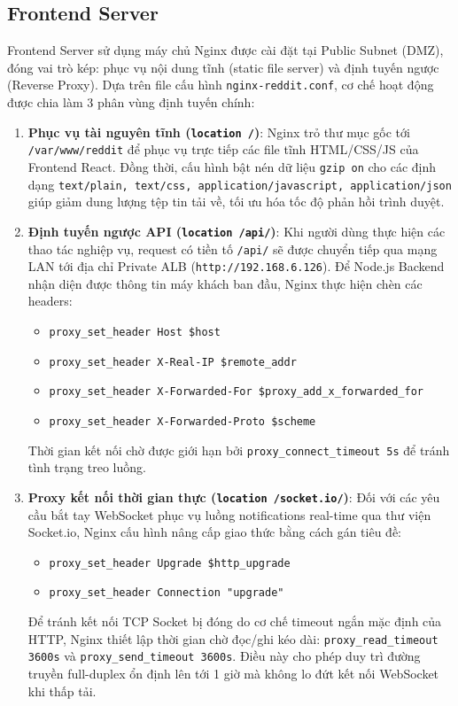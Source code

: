\documentclass[12pt, a4paper]{article}
\begin{document}
\subsection{Frontend Server}
Frontend Server sử dụng máy chủ Nginx được cài đặt tại Public Subnet (DMZ), đóng vai trò kép: phục vụ nội dung tĩnh (static file server) và định tuyến ngược (Reverse Proxy). Dựa trên file cấu hình \texttt{nginx-reddit.conf}, cơ chế hoạt động được chia làm 3 phân vùng định tuyến chính:
\begin{enumerate}
    \item \textbf{Phục vụ tài nguyên tĩnh (\texttt{location /})}:
    Nginx trỏ thư mục gốc tới \texttt{/var/www/reddit} để phục vụ trực tiếp các file tĩnh HTML/CSS/JS của Frontend React. Đồng thời, cấu hình bật nén dữ liệu \texttt{gzip on} cho các định dạng \texttt{text/plain, text/css, application/javascript, application/json} giúp giảm dung lượng tệp tin tải về, tối ưu hóa tốc độ phản hồi trình duyệt.
    \item \textbf{Định tuyến ngược API (\texttt{location /api/})}:
    Khi người dùng thực hiện các thao tác nghiệp vụ, request có tiền tố \texttt{/api/} sẽ được chuyển tiếp qua mạng LAN tới địa chỉ Private ALB (\texttt{http://192.168.6.126}). Để Node.js Backend nhận diện được thông tin máy khách ban đầu, Nginx thực hiện chèn các headers:
    \begin{itemize}
        \item \texttt{proxy\_set\_header Host \$host}
        \item \texttt{proxy\_set\_header X-Real-IP \$remote\_addr}
        \item \texttt{proxy\_set\_header X-Forwarded-For \$proxy\_add\_x\_forwarded\_for}
        \item \texttt{proxy\_set\_header X-Forwarded-Proto \$scheme}
    \end{itemize}
    Thời gian kết nối chờ được giới hạn bởi \texttt{proxy\_connect\_timeout 5s} để tránh tình trạng treo luồng.
    \item \textbf{Proxy kết nối thời gian thực (\texttt{location /socket.io/})}:
    Đối với các yêu cầu bắt tay WebSocket phục vụ luồng notifications real-time qua thư viện Socket.io, Nginx cấu hình nâng cấp giao thức bằng cách gán tiêu đề:
    \begin{itemize}
        \item \texttt{proxy\_set\_header Upgrade \$http\_upgrade}
        \item \texttt{proxy\_set\_header Connection "upgrade"}
    \end{itemize}
    Để tránh kết nối TCP Socket bị đóng do cơ chế timeout ngắn mặc định của HTTP, Nginx thiết lập thời gian chờ đọc/ghi kéo dài: \texttt{proxy\_read\_timeout 3600s} và \texttt{proxy\_send\_timeout 3600s}. Điều này cho phép duy trì đường truyền full-duplex ổn định lên tới 1 giờ mà không lo đứt kết nối WebSocket khi thấp tải.
\end{enumerate}
\end{document}
